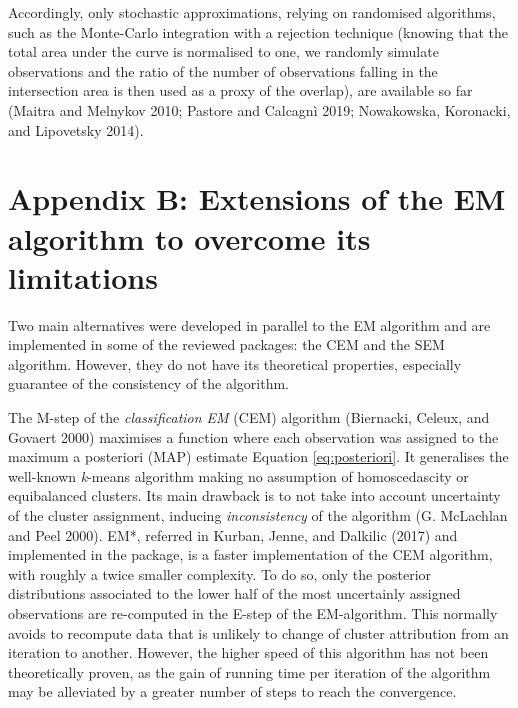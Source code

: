 Accordingly, only stochastic approximations, relying on randomised algorithms, such as the Monte-Carlo integration with a rejection technique (knowing that the total area under the curve is normalised to one, we randomly simulate observations and the ratio of the number of observations falling in the intersection area is then used as a proxy of the overlap), are available so far (Maitra and Melnykov 2010; Pastore and Calcagnì 2019; Nowakowska, Koronacki, and Lipovetsky 2014).

\hypertarget{appendix-b-extensions-of-the-em-algorithm-to-overcome-its-limitations}{%
\section{Appendix B: Extensions of the EM algorithm to overcome its limitations}\label{appendix-b-extensions-of-the-em-algorithm-to-overcome-its-limitations}}

Two main alternatives were developed in parallel to the EM algorithm and
are implemented in some of the reviewed packages: the CEM and the SEM
algorithm. However, they do not have its theoretical properties,
especially guarantee of the consistency of the algorithm.

The M-step of the \emph{classification EM} (CEM) algorithm
(Biernacki, Celeux, and Govaert 2000) maximises a function where each observation was
assigned to the maximum a posteriori (MAP) estimate Equation
\eqref{eq:posteriori}. It generalises the well-known \emph{k}-means algorithm
making no assumption of homoscedascity or equibalanced clusters. Its
main drawback is to not take into account uncertainty of the cluster
assignment, inducing \emph{inconsistency} of the algorithm
(G. McLachlan and Peel 2000). EM*, referred in Kurban, Jenne, and Dalkilic (2017) and implemented
in the  package, is a faster implementation of the CEM
algorithm, with roughly a twice smaller complexity. To do so, only the
posterior distributions associated to the lower half of the most
uncertainly assigned observations are re-computed in the E-step of the
EM-algorithm. This normally avoids to recompute data that is unlikely to
change of cluster attribution from an iteration to another. However, the
higher speed of this algorithm has not been theoretically proven, as the
gain of running time per iteration of the algorithm may be alleviated by
a greater number of steps to reach the convergence.

